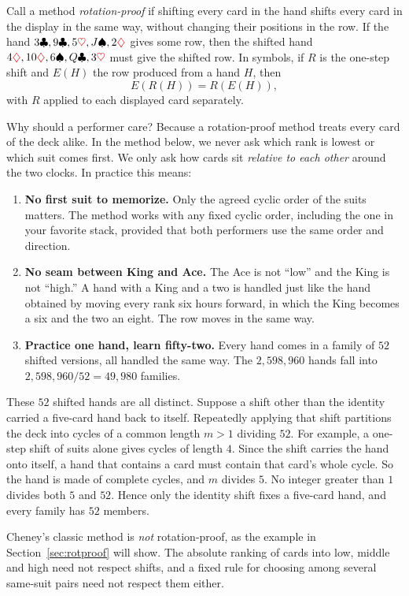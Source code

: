 \documentclass[11pt]{article}
\newcommand{\cl}{\ensuremath{\clubsuit}}
\newcommand{\di}{\textcolor{red!80!black}{\ensuremath{\diamondsuit}}}
\newcommand{\he}{\textcolor{red!80!black}{\ensuremath{\heartsuit}}}
\newcommand{\spd}{\ensuremath{\spadesuit}}
\begin{document}
Call a method \emph{rotation-proof} if shifting every card in the hand shifts every card in the display in the same way, without changing their positions in the row. If the hand $3\cl,9\cl,5\he,J\spd,2\di$ gives some row, then the shifted hand $4\di,10\di,6\spd,Q\cl,3\he$ must give the shifted row. In symbols, if $R$ is the one-step shift and $E(H)$ the row produced from a hand $H$, then $$E(R(H))=R(E(H)),$$ with $R$ applied to each displayed card separately.

Why should a performer care? Because a rotation-proof method treats every card of the deck alike. In the method below, we never ask which rank is lowest or which suit comes first. We only ask how cards sit \emph{relative to each other} around the two clocks. In practice this means:
\begin{enumerate}
\renewcommand{\labelenumi}{(\roman{enumi})}
\item \textbf{No first suit to memorize.} Only the agreed cyclic order of the suits matters. The method works with any fixed cyclic order, including the one in your favorite stack, provided that both performers use the same order and direction.
\item \textbf{No seam between King and Ace.} The Ace is not ``low'' and the King is not ``high.'' A hand with a King and a two is handled just like the hand obtained by moving every rank six hours forward, in which the King becomes a six and the two an eight. The row moves in the same way.
\item \textbf{Practice one hand, learn fifty-two.} Every hand comes in a family of $52$ shifted versions, all handled the same way. The $2{,}598{,}960$ hands fall into $2{,}598{,}960/52=49{,}980$ families.
\end{enumerate}

These $52$ shifted hands are all distinct. Suppose a shift other than the identity carried a five-card hand back to itself. Repeatedly applying that shift partitions the deck into cycles of a common length $m>1$ dividing $52$. For example, a one-step shift of suits alone gives cycles of length $4$. 
Since the shift carries the hand onto itself, a hand that contains a card must contain that card's whole cycle. So the hand is made of complete cycles, and $m$ divides $5$.
No integer greater than $1$ divides both $5$ and $52$. Hence only the identity shift fixes a five-card hand, and every family has $52$ members.

Cheney's classic method is \emph{not} rotation-proof, as the example
in Section~\ref{sec:rotproof} will show. The absolute ranking of cards
into low, middle and high need not respect shifts, and a fixed rule
for choosing among several same-suit pairs need not respect them
either.
\end{document}
